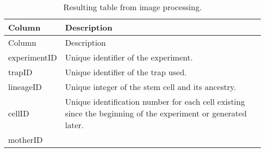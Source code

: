 \documentclass[
  12pt,
  a4paper,
  oneside]{krantz}
\begin{document}
\begin{longtable}[]{@{}ll@{}}
\caption{\label{tab:data-columns-specifications} Resulting table from image processing.}\tabularnewline
\toprule
\begin{minipage}[b]{0.33\columnwidth}\raggedright
Column\strut
\end{minipage} & \begin{minipage}[b]{0.61\columnwidth}\raggedright
Description\strut
\end{minipage}\tabularnewline
\midrule
\endfirsthead
\toprule
\begin{minipage}[b]{0.33\columnwidth}\raggedright
Column\strut
\end{minipage} & \begin{minipage}[b]{0.61\columnwidth}\raggedright
Description\strut
\end{minipage}\tabularnewline
\midrule
\endhead
\begin{minipage}[t]{0.33\columnwidth}\raggedright
experimentID\strut
\end{minipage} & \begin{minipage}[t]{0.61\columnwidth}\raggedright
Unique identifier of the experiment.\strut
\end{minipage}\tabularnewline
\begin{minipage}[t]{0.33\columnwidth}\raggedright
trapID\strut
\end{minipage} & \begin{minipage}[t]{0.61\columnwidth}\raggedright
Unique identifier of the trap used.\strut
\end{minipage}\tabularnewline
\begin{minipage}[t]{0.33\columnwidth}\raggedright
lineageID\strut
\end{minipage} & \begin{minipage}[t]{0.61\columnwidth}\raggedright
Unique integer of the stem cell and its ancestry.\strut
\end{minipage}\tabularnewline
\begin{minipage}[t]{0.33\columnwidth}\raggedright
cellID\strut
\end{minipage} & \begin{minipage}[t]{0.61\columnwidth}\raggedright
Unique identification number for each cell existing since the
beginning of the experiment or generated later.\strut
\end{minipage}\tabularnewline
\begin{minipage}[t]{0.33\columnwidth}\raggedright
motherID\strut
\end{minipage} & \begin{minipage}[t]{0.61\columnwidth}\raggedright

\end{minipage}
\end{longtable}
\end{document}
